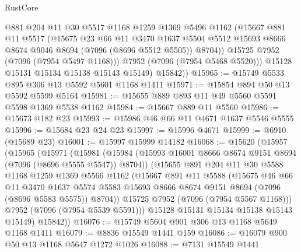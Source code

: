 \begin{lexlean}{RustCore}
\begin{coremodule}
              @881
              @204
              @11
              @30
              @5517
              @1168
              @1259
              @1369
              @5496
              @1162
              (@15667
                @881
                @11
                @5517
                (@15675
                  @23
                  @66
                  @11
                  @3470
                  @1637
                  @5504
                  @5512
                  @15693
                  @8666
                  @8674
                  @9046
                  @8694
                  (@7096 (@8696 @5512 @5505))
                  @8704))
              @15725
              @7952
              (@7096 (@7954 @5497 @1168)))
            @7952
            (@7096 (@7954 @5468 @5520)))
          @15128
          @15131
          @15134
          @15138
          @15143
          @15149)
        @15842))
@15965 := @15749 @5533 @895 @306 @13 @5592 @5601 @1168 @1411
@15971 := @15854 @894 @50 @13 @5592 @5599 @5164
@15981 := @15655 @889 @893 @11 @49 @5560 @5591 @5598 @1369 @5538 @1162
@15984 := @15667 @889 @11 @5560
@15986 := @15673 @182 @23
@15993 := @15986 @46 @66 @11 @4671 @1637 @5546 @5555
@15996 := @15684 @23 @24 @23
@15997 := @15996 @4671
@15999 := @6910 (@15689 @23)
@16001 := @15997 @15999 @14182
@16068 := @15620
    (@15957
      (@15965
        (@15971
          (@15981
            (@15984 (@15993 @16001 @8666 @8674 @9151 @8694 (@7096 (@8696 @5555 @5547)) @8704))
            (@15655
              @891
              @204
              @11
              @30
              @5588
              @1168
              @1259
              @1369
              @5566
              @1162
              (@15667
                @891
                @11
                @5588
                (@15675
                  @46
                  @66
                  @11
                  @3470
                  @1637
                  @5574
                  @5583
                  @15693
                  @8666
                  @8674
                  @9151
                  @8694
                  (@7096 (@8696 @5583 @5575))
                  @8704))
              @15725
              @7952
              (@7096 (@7954 @5567 @1168)))
            @7952
            (@7096 (@7954 @5539 @5591)))
          @15128
          @15131
          @15134
          @15138
          @15143
          @15149)
        @15842))
@16076 := @15749 @5604 @901 @306 @13 @1168 @5649 @1168 @1411
@16079 := @8836 @15549 @1441 @159
@16086 := @16079 @900 @50 @13 @1168 @5647 @1272 @1026
@16088 := @7131 @15549 @1441

\end{coremodule}
\end{lexlean}
